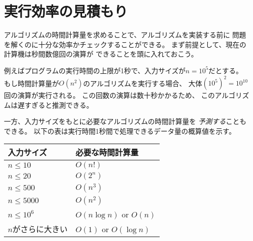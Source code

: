 \section{実行効率の見積もり}

アルゴリズムの時間計算量を求めることで、アルゴリズムを実装する前に
問題を解くのに十分な効率かチェックすることができる。
まず前提として、現在の計算機は秒間数億回の演算が
できることを頭に入れておこう。

\begin{comment}
For example, assume that the time limit for
a problem is one second and the input size is $n=10^5$.
If the time complexity is $O(n^2)$,
the algorithm will perform about $(10^5)^2=10^{10}$ operations.
This should take at least some tens of seconds,
so the algorithm seems to be too slow for solving the problem.

On the other hand, given the input size,
we can try to \emph{guess}
the required time complexity of the algorithm
that solves the problem.
The following table contains some useful estimates
assuming a time limit of one second.
\end{comment}

例えばプログラムの実行時間の上限が1秒で、入力サイズが$n=10^5$だとする。
もし時間計算量が$O(n^2)$のアルゴリズムを実行する場合、
大体$(10^5)^2=10^{10}$回の演算が実行される。
この回数の演算は数十秒かかるため、
このアルゴリズムは遅すぎると推測できる。

一方、入力サイズをもとに必要なアルゴリズムの時間計算量を
\emph{予測する}こともできる。
以下の表は実行時間1秒間で処理できるデータ量の概算値を示す。

\begin{comment}
\begin{center}
\begin{tabular}{ll}
input size & required time complexity \\
\hline
$n \le 10$ & $O(n!)$ \\
$n \le 20$ & $O(2^n)$ \\
$n \le 500$ & $O(n^3)$ \\
$n \le 5000$ & $O(n^2)$ \\
$n \le 10^6$ & $O(n \log n)$ or $O(n)$ \\
$n$ is large & $O(1)$ or $O(\log n)$ \\
\end{tabular}
\end{center}
\end{comment}

\begin{center}
\begin{tabular}{ll}
入力サイズ & 必要な時間計算量 \\
\hline
$n \le 10$ & $O(n!)$ \\
$n \le 20$ & $O(2^n)$ \\
$n \le 500$ & $O(n^3)$ \\
$n \le 5000$ & $O(n^2)$ \\
$n \le 10^6$ & $O(n \log n)$ or $O(n)$ \\
$n$がさらに大きい & $O(1)$ or $O(\log n)$ \\
\end{tabular}
\end{center}

